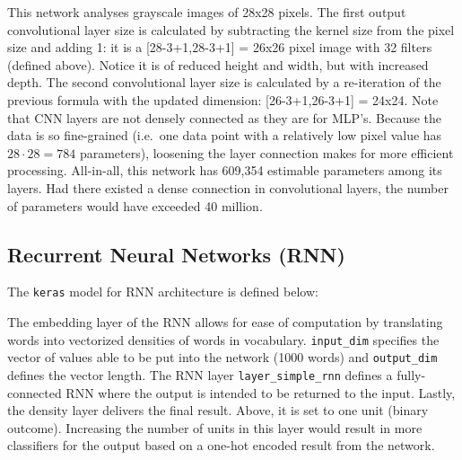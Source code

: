 This network analyses grayscale images of 28x28 pixels. The first output
convolutional layer size is calculated by subtracting the kernel size
from the pixel size and adding 1: it is a [28-3+1,28-3+1] = 
26x26 pixel image with 32 filters (defined above). Notice it is of
reduced height and width, but with increased depth. The second
convolutional layer size is calculated by a re-iteration of the previous
formula with the updated dimension: [26-3+1,26-3+1] =  24x24.
Note that CNN layers are not densely connected as they are for MLP's.
Because the data is so fine-grained (i.e.~one data point with a
relatively low pixel value has \(28 \cdot 28 = 784\) parameters),
loosening the layer connection makes for more efficient processing.
All-in-all, this network has 609,354 estimable parameters among its
layers. Had there existed a dense connection in convolutional layers,
the number of parameters would have exceeded 40 million.





\subsection{Recurrent Neural Networks
(RNN)}\label{recurrent-neural-networks-rnn}

The \texttt{keras} model for RNN architecture is defined below:

\begin{Shaded}
\begin{Highlighting}[]
\OtherTok{\textless{}{-}} \NormalTok{()}
\SpecialCharTok{\%\textgreater{}\%}
        \NormalTok{(} \NormalTok{, } \NormalTok{) }\SpecialCharTok{\%\textgreater{}\%}
        \NormalTok{(} \NormalTok{) }\SpecialCharTok{\%\textgreater{}\%}
        \NormalTok{(} \NormalTok{, } \NormalTok{)}
\end{Highlighting}
\end{Shaded}

The embedding layer of the RNN allows for ease of computation by
translating words into vectorized densities of words in vocabulary.
\texttt{input\_dim} specifies the vector of values able to be put into
the network (1000 words) and \texttt{output\_dim} defines the vector
length. The RNN layer \texttt{layer\_simple\_rnn} defines a
fully-connected RNN where the output is intended to be returned to the
input. Lastly, the density layer delivers the final result. Above, it is
set to one unit (binary outcome). Increasing the number of units in this
layer would result in more classifiers for the output based on a one-hot
encoded result from the network.